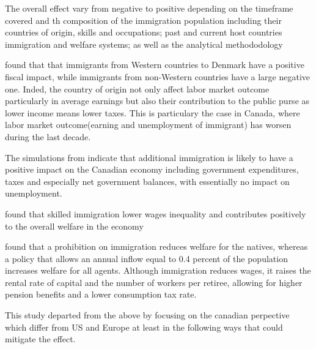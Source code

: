   The overall effect vary from negative to positive depending on the timeframe covered and th composition of the immigration population including their countries of origin\citep{Clarke:2013dh,Hansen:2017uz}, skills and occupations; past and current host countries immigration and welfare systems; as well as the analytical methododology


  \citep{Hansen:2017uz} found that that immigrants from Western countries to Denmark have a positive fiscal impact, while immigrants from non-Western countries have a large negative one. Inded, the country of origin not only affect labor  market outcome particularly in average earnings \citep{Clarke:2013dh} but also their contribution to the public purse as lower income means lower taxes. This is particulary the case in Canada, where labor  market outcome(earning and unemployment of immigrant) has worsen during the last decade.





  The simulations from \citep{dunganMacroeconomicImpactsCanadian2013} indicate that additional immigration is likely to have a positive impact on the Canadian economy including government expenditures, taxes and especially net government balances, with essentially no impact on unemployment.

  \citep{Ileri:2019hf} found that skilled immigration lower wages inequality and contributes positively to the overall welfare in the economy





  \citep{Akin:gh} found that a prohibition on immigration reduces welfare for the natives, whereas a policy that allows an annual inflow equal to 0.4 percent of the population increases welfare for all agents. Although immigration reduces wages, it raises the rental rate of capital and the number of workers per retiree, allowing for higher pension benefits and a lower consumption tax rate.







  This study departed from the above by focusing on the canadian perpective which differ from US and Europe at least in the following ways that could mitigate the effect.

